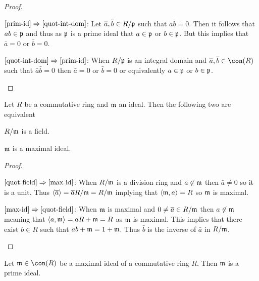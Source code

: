 \documentclass[8pt,a4paper]{article}
\begin{document}
\begin{proof}
    \begin{implications}
        \item[$\ref{prim-id}\implies\ref{quot-int-dom}$:]
    Let $\bar{a},\bar{b}\in R/\fkp$ such that $\bar{a}\bar{b}=0$. Then it follows that $ab\in\fkp$ and thus as $\fkp$ is a prime ideal that $a\in\fkp$ or $b\in\fkp$. But this implies that $\bar{a}=0$ or $\bar{b}=0$.
        \item[$\ref{quot-int-dom}\implies\ref{prim-id}$:]
    When $R/\fkp$ is an integral domain and $\bar{a},\bar{b}\in\con(R)$ such that $\bar{a}\bar{b}=0$ then $\bar{a}=0$ or $\bar{b}=0$ or equivalently $a\in\fkp$ or $b\in\fkp$.
\end{implications}
\end{proof}

\begin{lemma}
    Let $R$ be a commutative ring and $\fkm$ an ideal. Then the following two are equivalent
    \begin{statements}
            \item\label{quot-field} $R/\fkm$ is a field.
            \item\label{max-id} $\fkm$ is a maximal ideal.
    \end{statements}
\end{lemma}

\begin{proof}
    \begin{implications}
            \item[$\ref{quot-field}\implies\ref{max-id}$:]
        When $R/\fkm$ is a division ring and $a\not\in\fkm$ then $\bar{a}\neq 0$ so it is a unit. Thus $\gen{\bar{a}}=\bar{a}R/\fkm=R/\fkm$ implying that $\gen{\fkm,a}=R$ so $\fkm$ is maximal.
            \item[$\ref{max-id}\implies\ref{quot-field}$:]
        When $\fkm$ is maximal and $0\neq \bar{a}\in R/\fkm$ then $a\not\in \fkm$ meaning that $\gen{a,\fkm}=aR+\fkm=R$ as $\fkm$ is maximal. This implies that there exist $b\in R$ such that $ab+\fkm=1+\fkm$. Thus $\bar{b}$ is the inverse of $\bar{a}$ in $R/\fkm$.
    \end{implications}
\end{proof}
    
    
\begin{lemma}
    Let $\fkm\in\con(R)$ be a maximal ideal of a commutative ring $R$. Then $\fkm$ is a prime ideal.
\end{lemma}
\end{document}
